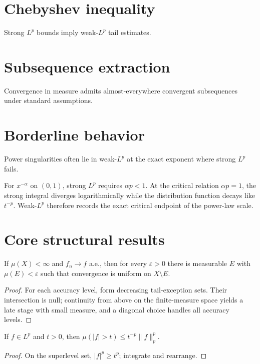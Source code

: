 \section{Chebyshev inequality}
Strong $L^p$ bounds imply weak-$L^p$ tail estimates.

\section{Subsequence extraction}
Convergence in measure admits almost-everywhere convergent subsequences under standard assumptions.

\section{Borderline behavior}
Power singularities often lie in weak-$L^p$ at the exact exponent where strong $L^p$ fails.


\begin{example}\label{ex:iii08-expand-03}
For \(x^{-\alpha}\) on \((0,1)\), strong \(L^p\) requires
\(\alpha p<1\). At the critical relation \(\alpha p=1\), the strong integral
diverges logarithmically while the distribution function decays like
\(t^{-p}\). Weak-\(L^p\) therefore records the exact critical endpoint of the
power-law scale.
\end{example}
\section{Core structural results}

\begin{theorem}\label{thm:iii08-01}
If $\mu(X)<\infty$ and $f_n\to f$ a.e., then for every $\varepsilon>0$ there is measurable $E$ with $\mu(E)<\varepsilon$ such that convergence is uniform on $X\setminus E$.
\begin{proof}
For each accuracy level, form decreasing tail-exception sets. Their intersection is null; continuity from above on the finite-measure space yields a late stage with small measure, and a diagonal choice handles all accuracy levels.
\end{proof}
\end{theorem}

\begin{theorem}\label{thm:iii08-02}
If $f\in L^p$ and $t>0$, then $\mu(|f|>t)\le t^{-p}\|f\|_p^p$.
\begin{proof}
On the superlevel set, $|f|^p\ge t^p$; integrate and rearrange.
\end{proof}
\end{theorem}

